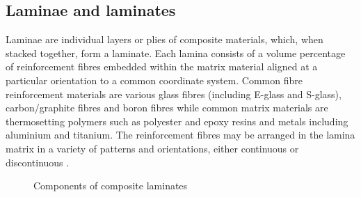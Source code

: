 \subsection{Laminae and laminates}

Laminae are individual layers or plies of composite materials, which, when stacked together, form a laminate. Each lamina consists of a volume percentage of reinforcement fibres embedded within the matrix material aligned at a particular orientation to a common coordinate system. Common fibre reinforcement materials are various glass fibres (including E-glass and S-glass), carbon/graphite fibres and boron fibres while common matrix materials are thermosetting polymers such as polyester and epoxy resins and metals including aluminium and titanium. The reinforcement fibres may be arranged in the lamina matrix in a variety of patterns and orientations, either continuous or discontinuous \cite{agarwal2006analysis}. 
\begin{figure}[H]
	\caption{\label{composite_laminates}Components of composite laminates \cite{reddy2004mechanics}}
\end{figure}

